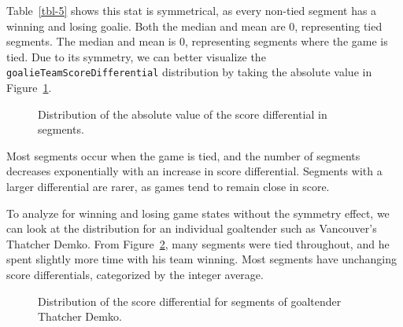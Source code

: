 \documentclass[
  letterpaper,
  DIV=11,
  numbers=noendperiod]{scrartcl}
\begin{document}
Table~\ref{tbl-5} shows this stat is symmetrical, as every non-tied
segment has a winning and losing goalie. Both the median and mean are 0,
representing tied segments. The median and mean is 0, representing
segments where the game is tied. Due to its symmetry, we can better
visualize the \texttt{goalieTeamScoreDifferential} distribution by
taking the absolute value in Figure~\ref{fig-2}.

\begin{figure}


\caption{\label{fig-2}Distribution of the absolute value of the score
differential in segments.}

\end{figure}%

Most segments occur when the game is tied, and the number of segments
decreases exponentially with an increase in score differential. Segments
with a larger differential are rarer, as games tend to remain close in
score.

To analyze for winning and losing game states without the symmetry
effect, we can look at the distribution for an individual goaltender
such as Vancouver's Thatcher Demko. From Figure~\ref{fig-3}, many
segments were tied throughout, and he spent slightly more time with his
team winning. Most segments have unchanging score differentials,
categorized by the integer average.

\begin{figure}


\caption{\label{fig-3}Distribution of the score differential for
segments of goaltender Thatcher Demko.}

\end{figure}%
\end{document}

